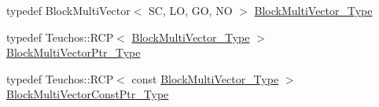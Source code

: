 \begin{DoxyCompactItemize}
\item 
typedef Block\+Multi\+Vector$<$ SC, LO, GO, NO $>$ \hyperlink{classFEDD_1_1AdaptiveMeshRefinement_ace60cfe1caf8767564c40edef5ca8b0b}{Block\+Multi\+Vector\+\_\+\+Type}
\item 
typedef Teuchos\+::\+R\+CP$<$ \hyperlink{classFEDD_1_1AdaptiveMeshRefinement_ace60cfe1caf8767564c40edef5ca8b0b}{Block\+Multi\+Vector\+\_\+\+Type} $>$ \hyperlink{classFEDD_1_1AdaptiveMeshRefinement_aba249beb6c7ef61bd78d2f4ad3be68fe}{Block\+Multi\+Vector\+Ptr\+\_\+\+Type}
\item 
typedef Teuchos\+::\+R\+CP$<$ const \hyperlink{classFEDD_1_1AdaptiveMeshRefinement_ace60cfe1caf8767564c40edef5ca8b0b}{Block\+Multi\+Vector\+\_\+\+Type} $>$ \hyperlink{classFEDD_1_1AdaptiveMeshRefinement_a62f59092ab4dee90885c4d38b123ca9c}{Block\+Multi\+Vector\+Const\+Ptr\+\_\+\+Type}
\end{DoxyCompactItemize}
